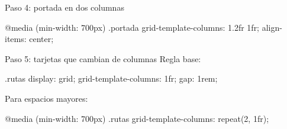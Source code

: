 \documentclass[aspectratio=169,11pt]{beamer}
\begin{document}
    \begin{frame}[fragile]{Paso 4: portada en dos columnas}
        \begin{csscodedark}
            @media (min-width: 700px) {
                .portada {
                    grid-template-columns: 1.2fr 1fr;
                    align-items: center;
                }
            }
        \end{csscodedark}

        \begin{center}
        \end{center}
    \end{frame}

    \begin{frame}[fragile]{Paso 5: tarjetas que cambian de columnas}
        Regla base:

        \begin{csscodedark}
            .rutas {
                display: grid;
                grid-template-columns: 1fr;
                gap: 1rem;
            }
        \end{csscodedark}

        Para espacios mayores:

        \begin{csscodedark}
            @media (min-width: 700px) {
                .rutas {
                    grid-template-columns: repeat(2, 1fr);
                }
            }
        \end{csscodedark}
    \end{frame}
\end{document}
